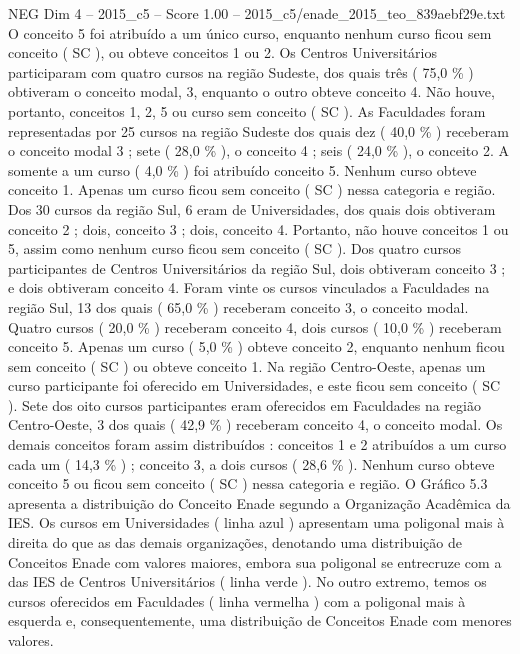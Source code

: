 \begin{textsample}{NEG Dim 4 – 2015\_c5 – Score 1.00 – 2015\_c5/enade\_2015\_teo\_839aebf29e.txt}
O conceito 5 foi atribuído a um único curso, enquanto nenhum curso ficou sem conceito ( SC ), ou obteve conceitos 1 ou 2.
Os Centros Universitários participaram com quatro cursos na região Sudeste, dos quais três ( 75,0 \% ) obtiveram o conceito modal, 3, enquanto o outro obteve conceito 4.
Não houve, portanto, conceitos 1, 2, 5 ou curso sem conceito ( SC ).
As Faculdades foram representadas por 25 cursos na região Sudeste dos quais dez ( 40,0 \% ) receberam o conceito modal 3 ; sete ( 28,0 \% ), o conceito 4 ; seis ( 24,0 \% ), o conceito 2.
A somente a um curso ( 4,0 \% ) foi atribuído conceito 5.
Nenhum curso obteve conceito 1.
Apenas um curso ficou sem conceito ( SC ) nessa categoria e região.
Dos 30 cursos da região Sul, 6 eram de Universidades, dos quais dois obtiveram conceito 2 ; dois, conceito 3 ; dois, conceito 4.
Portanto, não houve conceitos 1 ou 5, assim como nenhum curso ficou sem conceito ( SC ).
Dos quatro cursos participantes de Centros Universitários da região Sul, dois obtiveram conceito 3 ; e dois obtiveram conceito 4.
Foram vinte os cursos vinculados a Faculdades na região Sul, 13 dos quais ( 65,0 \% ) receberam conceito 3, o conceito modal.
Quatro cursos ( 20,0 \% ) receberam conceito 4, dois cursos ( 10,0 \% ) receberam conceito 5.
Apenas um curso ( 5,0 \% ) obteve conceito 2, enquanto nenhum ficou sem conceito ( SC ) ou obteve conceito 1.
Na região Centro-Oeste, apenas um curso participante foi oferecido em Universidades, e este ficou sem conceito ( SC ).
Sete dos oito cursos participantes eram oferecidos em Faculdades na região Centro-Oeste, 3 dos quais ( 42,9 \% ) receberam conceito 4, o conceito modal.
Os demais conceitos foram assim distribuídos : conceitos 1 e 2 atribuídos a um curso cada um ( 14,3 \% ) ; conceito 3, a dois cursos ( 28,6 \% ).
Nenhum curso obteve conceito 5 ou ficou sem conceito ( SC ) nessa categoria e região.
O Gráfico 5.3 apresenta a distribuição do Conceito Enade segundo a Organização Acadêmica da IES.
Os cursos em Universidades ( linha azul ) apresentam uma poligonal mais à direita do que as das demais organizações, denotando uma distribuição de Conceitos Enade com valores maiores, embora sua poligonal se entrecruze com a das IES de Centros Universitários ( linha verde ).
No outro extremo, temos os cursos oferecidos em Faculdades ( linha vermelha ) com a poligonal mais à esquerda e, consequentemente, uma distribuição de Conceitos Enade com menores valores.

\end{textsample}
